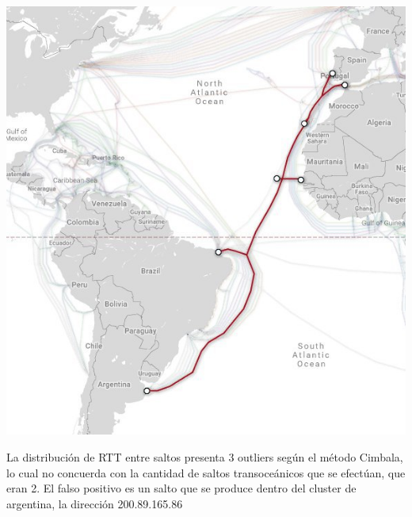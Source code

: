 \includegraphics[width=\textwidth]{submarine_cable.jpg}

La distribución de RTT entre saltos presenta 3 outliers según el método Cimbala, lo cual no concuerda con la cantidad de saltos transoceánicos que se efectúan, que eran 2. El falso positivo es un salto que se produce dentro del cluster de argentina, la dirección  200.89.165.86
